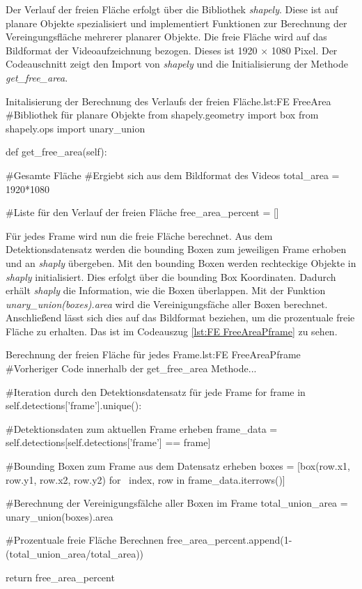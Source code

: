 Der Verlauf der freien Fläche erfolgt über die Bibliothek \textit{shapely}. Diese ist auf planare Objekte spezialisiert und implementiert Funktionen zur Berechnung der Vereingungsfläche mehrerer planarer Objekte. Die freie Fläche wird auf das Bildformat der Videoaufzeichnung bezogen. Dieses ist 1920 × 1080 Pixel.  Der Codeauschnitt zeigt den Import von \textit{shapely} und die Initialisierung der Methode \textit{get\_free\_area}. 

\begin{pythoncode}{Initalisierung der Berechnung des Verlaufs der freien Fläche.}{lst:FE FreeArea}
#Bibliothek für planare Objekte
from shapely.geometry import box
from shapely.ops import unary_union

def get_free_area(self):  
    
    #Gesamte Fläche 
    #Ergiebt sich aus dem Bildformat des Videos
    total_area = 1920*1080

    #Liste für den Verlauf der freien Fläche
    free_area_percent = []

\end{pythoncode}

Für jedes Frame wird nun die freie Fläche berechnet. Aus dem Detektionsdatensatz werden die bounding Boxen zum jeweiligen Frame erhoben und an \textit{shaply} übergeben. Mit den bounding Boxen werden rechteckige Objekte in \textit{shaply} initialisiert. Dies erfolgt über die bounding Box Koordinaten. Dadurch erhält \textit{shaply} die Information, wie die Boxen überlappen. Mit der Funktion \textit{unary\_union(boxes).area} wird die Vereinigungsfäche aller Boxen berechnet. Anschließend lässt sich dies auf das Bildformat beziehen, um die prozentuale freie Fläche zu erhalten. Das ist im Codeauszug \ref{lst:FE FreeAreaPframe} zu sehen. 

\begin{pythoncode}{Berechnung der freien Fläche für jedes Frame.}{lst:FE FreeAreaPframe}
#Vorheriger Code innerhalb der get_free_area Methode...

#Iteration durch den Detektionsdatensatz für jede Frame
for frame in self.detections['frame'].unique():

    #Detektionsdaten zum aktuellen Frame erheben
    frame_data = self.detections[self.detections['frame'] == frame]

    #Bounding Boxen zum Frame aus dem Datensatz erheben
    boxes = [box(row.x1, row.y1, row.x2, row.y2) for \ 
            index, row in frame_data.iterrows()]
   
    #Berechnung der Vereinigungsfälche aller Boxen im Frame
    total_union_area = unary_union(boxes).area

    #Prozentuale freie Fläche Berechnen 
    free_area_percent.append(1-(total_union_area/total_area))

return free_area_percent

\end{pythoncode}


